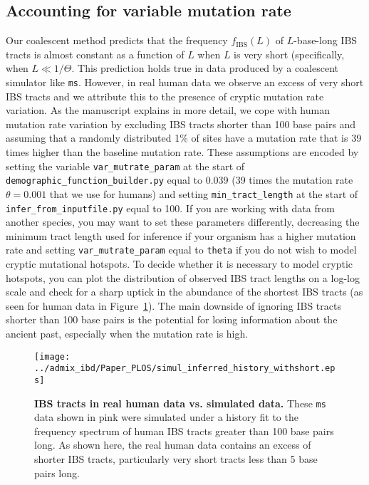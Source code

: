 \documentclass[12pt]{article}
\begin{document}
\subsection{Accounting for variable mutation rate}

Our coalescent method predicts that the frequency $f_{\textrm{IBS}}(L)$ of $L$-base-long IBS tracts is almost constant as a function of $L$ when $L$ is very short (specifically, when $L\ll 1/\Theta$. This prediction holds true in data produced by a coalescent simulator like \texttt{ms}. However, in real human data we observe an excess of very short IBS tracts and we attribute this to the presence of cryptic mutation rate variation. As the manuscript explains in more detail, we cope with human mutation rate variation by excluding IBS tracts shorter than 100 base pairs and assuming that a randomly distributed 1\% of sites have a mutation rate that is 39 times higher than the baseline mutation rate. These assumptions are encoded by setting the variable \verb|var_mutrate_param| at the start of  \verb|demographic_function_builder.py| equal to 0.039 (39 times the mutation rate $\theta=0.001$ that we use for humans) and setting \verb|min_tract_length| at the start of \verb|infer_from_inputfile.py| equal to 100. If you are working with data from another species, you may want to set these parameters differently, decreasing the minimum tract length used for inference if your organism has a higher mutation rate and setting \verb|var_mutrate_param| equal to \verb|theta| if you do not wish to model cryptic mutational hotspots. To decide whether it is necessary to model cryptic hotspots, you can plot the distribution of observed IBS tract lengths on a log-log scale and check for a sharp uptick in the abundance of the shortest IBS tracts (as seen for human data in Figure~\ref{mut_rate_variation}). The main downside of ignoring IBS tracts shorter than 100 base pairs is the potential for losing information about the ancient past, especially when the mutation rate is high.

\begin{figure}
\begin{center}
\texttt{[image: ../admix\_ibd/Paper\_PLOS/simul\_inferred\_history\_withshort.eps]}
\caption{\textbf{IBS tracts in real human data vs. simulated data.} These \texttt{ms} data shown in pink were simulated under a history fit to the frequency spectrum of human IBS tracts greater than 100 base pairs long. As shown here, the real human data contains an excess of shorter IBS tracts, particularly very short tracts less than 5 base pairs long.}\label{mut_rate_variation}
\end{center}
\end{figure}
\end{document}
